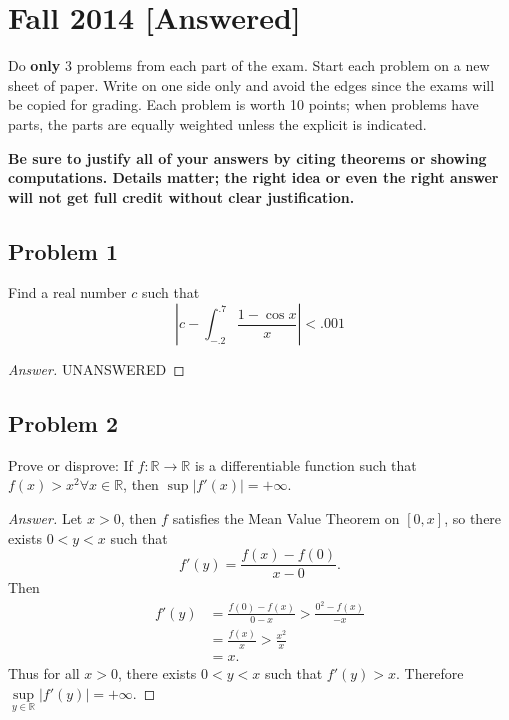 \documentclass[12pt]{article}
\newcommand{\real}{\mathbb{R}}
\newcommand{\abs}[1]{\left | #1 \right |}
\theoremstyle{definition}
\begin{document}
\section{Fall 2014 [Answered]}
Do \textbf{only} 3 problems from each part of the exam. Start each problem on a new sheet of paper. Write on one side only and avoid the edges since the exams will be copied for grading. Each problem is worth 10 points; when problems have parts, the parts are equally weighted unless the explicit is indicated.

\textbf{Be sure to justify all of your answers by citing theorems or showing computations. Details matter; the right idea or even the right answer will not get full credit without clear justification.}
\subsection{Problem 1}
Find a real number $c$ such that 
\[
    \abs{ c - \int_{-.2}^{.7} \frac{1 - \cos x}{x} } < .001
\]
\begin{proof}[Answer]
    UNANSWERED
\end{proof}
\subsection{Problem 2}
Prove or disprove: If $f : \real \to \real$ is a differentiable function such that $f(x) > x^2 \forall x \in \real$, then $\sup \abs{ f'(x) } = +\infty$.
\begin{proof}[Answer]
    Let $x > 0$, then $f$ satisfies the Mean Value Theorem on $[0,x]$, so there exists $0 < y < x$ such that 
    \[
        f'(y) = \frac{f(x) - f(0)}{x - 0}.
    \]
    Then 
    \begin{align*}
        f'(y) & = \frac{f(0) - f(x)}{0 - x} > \frac{0^2 - f(x)}{-x} \\
        & = \frac{f(x)}{x} > \frac{x^2}{x} \\
        & = x.
    \end{align*}
    Thus for all $x > 0$, there exists $0 < y < x$ such that $f'(y) > x$. Therefore $\sup\limits_{y \in \real} \abs{ f'(y) } = +\infty$.
\end{proof}
\end{document}
